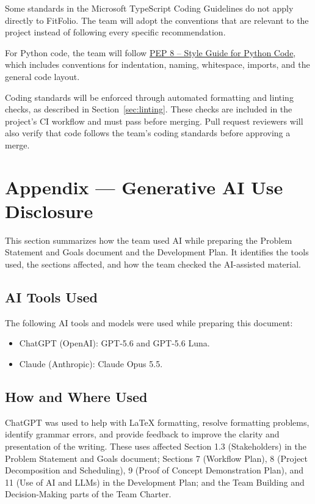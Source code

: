 \documentclass{article}
\begin{document}
Some standards in the Microsoft TypeScript Coding Guidelines do not 
apply directly to FitFolio. The team will adopt the conventions
that are relevant to the project instead of following every specific 
recommendation.


For Python code, the team will follow
\href{https://peps.python.org/pep-0008/}{PEP 8 -- Style Guide for Python Code}, which includes conventions for indentation, naming, whitespace, imports, and the general code layout.


Coding standards will be enforced through automated formatting and linting checks, as described in Section~\ref{sec:linting}. These checks are included in the project's CI workflow and must pass before merging. Pull request reviewers will also verify that code follows the team's coding standards before approving a merge.
\newpage{}

\section{Appendix --- Generative AI Use Disclosure}

This section summarizes how the team used AI while preparing the Problem Statement and Goals document and the Development Plan. It identifies the tools used, the sections affected, and how the team checked the AI-assisted material.

\subsection{AI Tools Used}

The following AI tools and models were used while preparing this document:
\begin{itemize}
    \item ChatGPT (OpenAI): GPT-5.6 and GPT-5.6 Luna.
    \item Claude (Anthropic): Claude Opus 5.5. 

\end{itemize}


\subsection{How and Where Used}

ChatGPT was used to help with LaTeX formatting, resolve formatting problems, identify grammar errors, and provide feedback to improve the clarity and presentation of the writing. These uses affected Section 1.3 (Stakeholders) in the Problem Statement and Goals document; Sections 7 (Workflow Plan), 8 (Project Decomposition and Scheduling), 9 (Proof of Concept Demonstration Plan), and 11 (Use of AI and LLMs) in the Development Plan; and the Team Building and Decision-Making parts of the Team Charter. 
\end{document}
